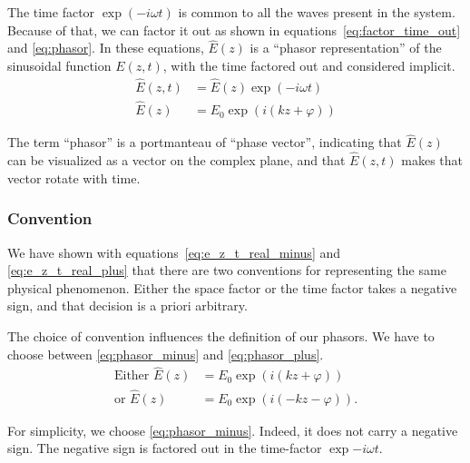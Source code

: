 The time factor $\exp({-i \omega t})$ is common to all the waves present in the system.
Because of that, we can factor it out as shown in equations~\ref{eq:factor_time_out} and \ref{eq:phasor}.
In these equations, $\hat{E}(z)$ is a ``phasor representation'' of the sinusoidal function $E(z, t)$, with the time factored out and considered implicit.
\begin{align}
    \hat{E}(z, t) &= \hat{E}(z) \exp(-i\omega t) \label{eq:factor_time_out}
    \\
    \hat{E}(z) &= E_0 \exp(i(kz+\varphi)) \label{eq:phasor}
\end{align}

The term ``phasor'' is a portmanteau of ``phase vector'', indicating that $\hat{E}(z)$ can be visualized as a vector on the complex plane, and that $\hat{E}(z, t)$ makes that vector rotate with time.

\subsubsection{Convention}
We have shown with equations~\ref{eq:e_z_t_real_minus} and \ref{eq:e_z_t_real_plus} that there are two conventions for representing the same physical phenomenon.
Either the space factor or the time factor takes a negative sign, and that decision is a priori arbitrary.

The choice of convention influences the definition of our phasors.
We have to choose between
\cref{eq:phasor_minus} and \cref{eq:phasor_plus}.
\begin{subequations}
    \begin{align}
        \text{Either }
        \hat{E}(z) &= E_0 \exp(i(kz+\varphi))
        \label{eq:phasor_minus}
        \\
        \text{or }
        \hat{E}(z) &= E_0 \exp(i(-kz-\varphi))
        \text{.}
         \label{eq:phasor_plus}
    \end{align}    
\end{subequations}

For simplicity, we choose \cref{eq:phasor_minus}.
Indeed, it does not carry a negative sign.
The negative sign is factored out in the time-factor $\exp{-i \omega t}$.


